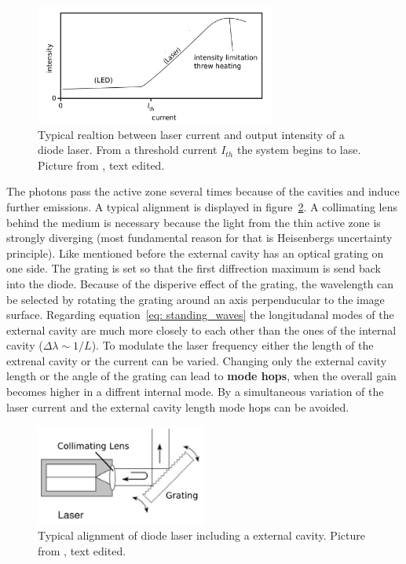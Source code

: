 \begin{figure}
  \centering
  \includegraphics[width = 0.7\textwidth]{pics/threshold.png}
  \caption{Typical realtion between laser current and output intensity of a diode laser. From a threshold current 
  $I_{th}$ the system begins to lase. Picture from \cite{eichler}, text edited.}
  \label{fig: threshold}
\end{figure}

The photons pass the active zone several times because of the cavities and induce further emissions. A typical alignment is displayed in figure~\ref{fig: cavity}.
A collimating lens behind the medium is necessary because the light from the thin active zone is strongly diverging (most 
fundamental reason for that is Heisenbergs uncertainty principle).
Like mentioned before the external cavity has an optical grating on one side. The grating is set so that the first diffrection maximum is send back into the
diode. Because of the disperive effect of the grating, the wavelength can be selected by rotating the grating around an axis perpenducular
to the image surface. Regarding equation~\eqref{eq: standing_waves} the longitudanal modes of the external cavity are much
more closely to each other than the ones of the internal cavity ($\Delta \lambda \sim 1 / L$).
To modulate the laser frequency either the length of the extrenal cavity or the current can be varied.
Changing only the external cavity length or the angle of the grating can lead to \textbf{mode hops}, when the overall gain becomes higher
in a diffrent internal mode. By a simultaneous variation of the laser current and the external cavity length mode hops can be avoided.

\begin{figure}
  \centering
  \includegraphics[width = 0.5\textwidth]{pics/cavity.pdf}
  \caption{Typical alignment of diode laser including a external cavity. 
  Picture from \cite{eichler}, text edited.}
  \label{fig: cavity}
\end{figure}